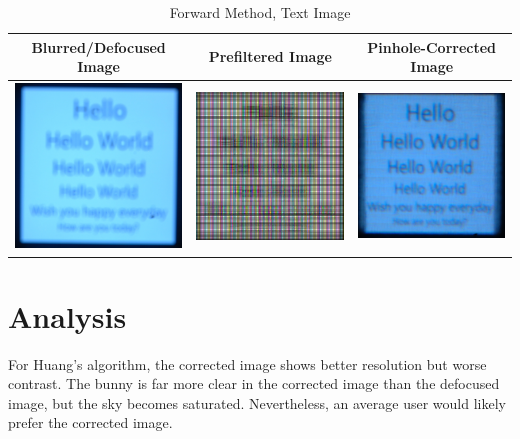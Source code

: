\begin{table}[h!]
  \centering
    \caption {Forward Method, Text Image}
    \begin{tabular}{| c | c | c |}
    \hline Blurred/Defocused Image & Prefiltered Image & Pinhole-Corrected Image \\ \hline
      \includegraphics[width=1.9in]{chapters/chapter5/images/Shichao_Words_380_250_Origin.JPG} &
      \includegraphics[width=1.9in]{chapters/chapter5/images/Shichao_word_Prefiltered.png} &
      \includegraphics[width=1.9in]{chapters/chapter5/images/Shichao_Words_380_250_Pinhole.JPG} \\ \hline
    \end{tabular}
\end{table} 

\newpage
\section{Analysis}

For Huang’s algorithm, the corrected image shows better resolution but worse contrast. The bunny is far more clear in the corrected image than the defocused image, but the sky becomes saturated. Nevertheless, an average user would likely prefer the corrected image. 

